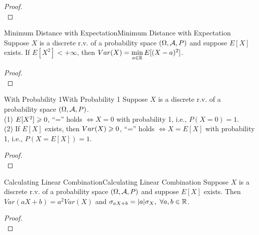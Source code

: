 \documentclass{elegantbook}
\begin{document}
\begin{proof}
\\[4cm]\vspace{0.01cm}
\end{proof}

\begin{theorem}{Minimum Distance with Expectation}{Minimum Distance with Expectation}
Suppose $X$ is a discrete r.v. of a probability space $(\Omega,\mathcal{A}, P)$ and suppose $E[X]$ exists. If $E[X^2 ]<+\infty$, then $Var(X)=\min\limits_{a\in\mathbb{R}}E[(X-a)^2]$.
\end{theorem}

\begin{proof}
\\[4cm]\vspace{0.01cm}
\end{proof}

\begin{theorem}{With Probability 1}{With Probability 1}
Suppose $X$ is a discrete r.v. of a probability space $(\Omega,\mathcal{A}, P)$.\\
(1) $E[X^2 ]\geqslant0$, ``='' holds $\Leftrightarrow X=0$ with probability 1, i.e., $P(X=0)=1$.\\
(2) If $E[X]$ exists, then $Var(X)\geqslant0$, ``='' holds $\Leftrightarrow X=E[X]$ with probability 1, i.e., $P(X=E[X])=1$.
\end{theorem}

\begin{proof}
\\[4cm]\vspace{0.01cm}
\end{proof}

\begin{theorem}{Calculating Linear Combination}{Calculating Linear Combination}
Suppose $X$ is a discrete r.v. of a probability space $(\Omega,\mathcal{A}, P)$ and suppose $E[X]$ exists. Then $Var(aX+b)=a^2 Var(X)$ and $\sigma_{aX+b}=|a| \sigma_X,\ \forall a,b\in\mathbb{R}$.
\end{theorem}

\begin{proof}
\\[4cm]\vspace{0.01cm}
\end{proof}
\end{document}
